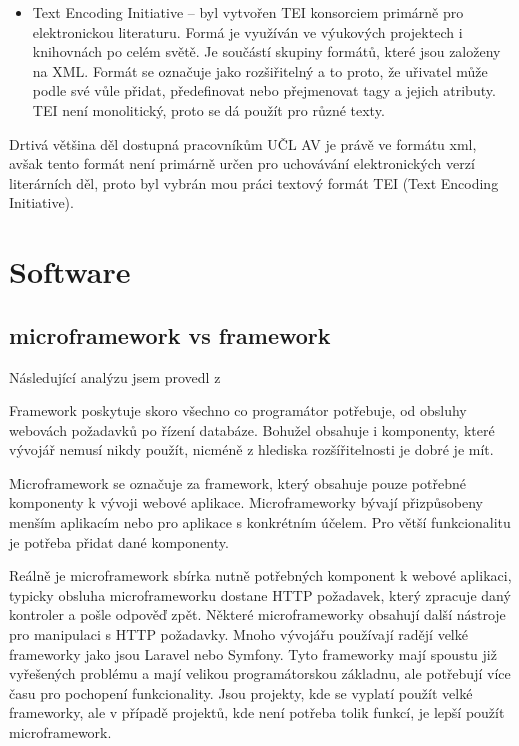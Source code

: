 \begin{itemize}
                \item Text Encoding Initiative – byl vytvořen TEI konsorciem primárně pro elektronickou literaturu. Formá je využíván ve výukových projektech i knihovnách po celém světě. Je součástí skupiny formátů, které jsou založeny na XML. Formát se označuje jako rozšiřitelný a to proto, že uřivatel může podle své vůle přidat, předefinovat nebo přejmenovat tagy a jejich atributy. TEI není monolitický, proto se dá použít pro různé texty.
            \end{itemize}
            
            Drtivá většina děl dostupná pracovníkům UČL AV je právě ve formátu xml, avšak tento formát není primárně určen pro uchovávání elektronických verzí literárních děl, proto byl vybrán mou práci textový formát TEI (Text Encoding Initiative).
    \section{Software}
        \subsection{microframework vs framework}
            Následující analýzu jsem provedl z \cite{microframework-vs-framework}
            
            Framework poskytuje skoro všechno co programátor potřebuje, od obsluhy webovách požadavků po řízení databáze. Bohužel obsahuje i komponenty, které vývojář nemusí nikdy použít, nicméně z hlediska rozšířitelnosti je dobré je mít.
            
            Microframework se označuje za framework, který obsahuje pouze potřebné komponenty k vývoji webové aplikace. Microframeworky bývají přizpůsobeny menším aplikacím nebo pro aplikace s konkrétním účelem. Pro větší funkcionalitu je potřeba přidat dané komponenty.
            
            Reálně je microframework sbírka nutně potřebných komponent k webové aplikaci, typicky obsluha microframeworku dostane HTTP požadavek, který zpracuje daný kontroler a pošle odpověď zpět. Některé microframeworky obsahují další nástroje pro manipulaci s HTTP požadavky. Mnoho vývojářu používají radějí velké frameworky jako jsou  Laravel nebo Symfony. Tyto frameworky mají spoustu již vyřešených problému a mají velikou programátorskou základnu, ale potřebují více času pro pochopení funkcionality. Jsou projekty, kde se vyplatí použít velké frameworky, ale v případě projektů, kde není potřeba tolik funkcí, je lepší použít microframework.
        
